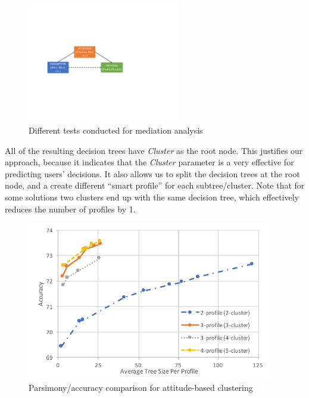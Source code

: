 \begin{figure}[htb]
	\centering
	\includegraphics[width=0.6\textwidth]{figures/mediation_test.pdf}
	\caption{Different tests conducted for mediation analysis}
	\label{fig:mediation_test2}
\end{figure}


All of the resulting decision trees have \emph{Cluster} as the root node. This justifies our approach, because it indicates that the \emph{Cluster} parameter is a very effective for predicting users' decisions. It also allows us to split the decision trees at the root node, and a create different ``smart profile'' for each subtree/cluster. Note that for some solutions two clusters end up with the same decision tree, which effectively reduces the number of profiles by 1.

\begin{figure}
	\centering
	\includegraphics[width=0.95\textwidth]{figures/attitudeSum2.pdf}
	\caption{Parsimony/accuracy comparison for attitude-based clustering}
	\label{fig:attitudesum}
\end{figure}

